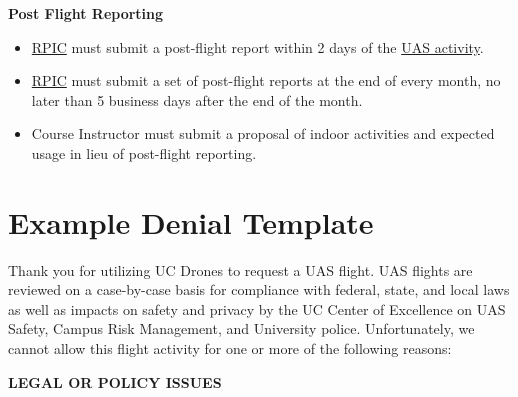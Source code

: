 \documentclass[
]{book}
\providecommand{\tightlist}{%
  \setlength{\itemsep}{0pt}\setlength{\parskip}{0pt}}
\begin{document}
\textbf{Post Flight Reporting}

\begin{itemize}
\tightlist
\item
  \protect\hyperlink{RPIC}{RPIC} must submit a post-flight report within 2 days of the \protect\hyperlink{UASactivity}{UAS activity}.
\item
  \protect\hyperlink{RPIC}{RPIC} must submit a set of post-flight reports at the end of every month, no later than 5 business days after the end of the month.
\item
  Course Instructor must submit a proposal of indoor activities and expected usage in lieu of post-flight reporting.
\end{itemize}

\hypertarget{ch-example-denial}{%
\chapter{Example Denial Template}\label{ch-example-denial}}

Thank you for utilizing UC Drones to request a UAS flight. UAS flights are reviewed on a case-by-case basis for compliance with federal, state, and local laws as well as impacts on safety and privacy by the UC Center of Excellence on UAS Safety, Campus Risk Management, and University police. Unfortunately, we cannot allow this flight activity for one or more of the following reasons:

\textbf{LEGAL OR POLICY ISSUES}
\end{document}
